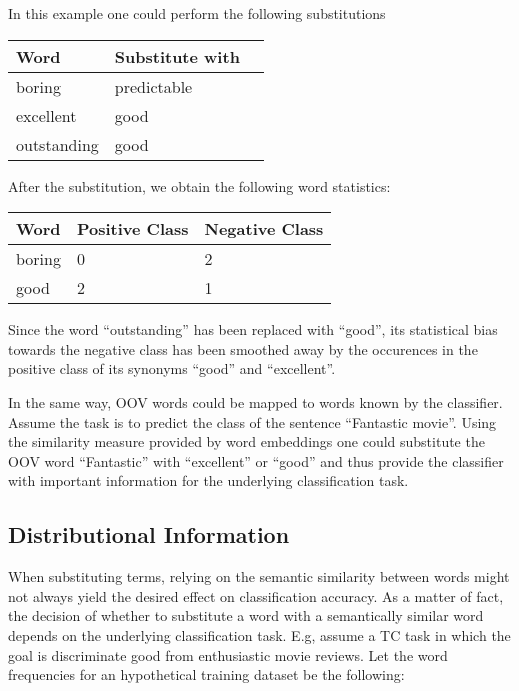 In this example one could perform the following substitutions

\begin{center}
\begin{tabular}{l|l|l}
\textbf{Word} & \textbf{Substitute with}  \\
\hline
boring & predictable \\
excellent & good \\
outstanding & good \\
\end{tabular}
\end{center}

After the substitution, we obtain the following word statistics:

\begin{center}
\begin{tabular}{l|l|l}
\textbf{Word} & \textbf{Positive Class} & \textbf{Negative Class}  \\
\hline
boring & 0 & 2 \\
good & 2 & 1 \\
\end{tabular}
\end{center}

Since the word ``outstanding'' has been replaced with ``good'', its
statistical bias towards the negative class has been smoothed away by the
occurences in the positive class of its synonyms ``good'' and ``excellent''.
 
In the same way, OOV words could be mapped to words known by the
classifier. Assume the task is to predict the class of the sentence ``Fantastic movie''. 
Using the similarity measure provided by word embeddings one could substitute
the OOV word ``Fantastic'' with ``excellent'' or ``good'' and thus provide the
classifier with important information for the underlying classification task.

\subsection{Distributional Information}
When substituting terms, relying on the semantic similarity between
words might not always yield the desired effect on classification
accuracy. As a matter of fact, the decision of whether to substitute
a word with a semantically similar word depends on the underlying
classification task.
E.g, assume a TC task in which the goal is discriminate good from enthusiastic
movie reviews. Let the word frequencies for an hypothetical training dataset be the following:

